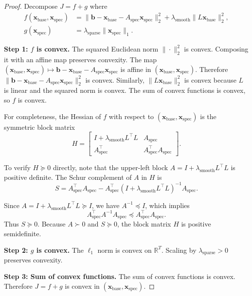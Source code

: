 \documentclass[10pt]{article} %
\theoremstyle{plain}
\theoremstyle{definition}
\newcommand{\xbase}{\mathbf{x}_{\text{base}}}
\newcommand{\xspec}{\mathbf{x}_{\text{spec}}}
\newcommand{\Aspec}{A_{\text{spec}}}
\newcommand{\bvec}{\mathbf{b}}
\begin{document}
\begin{proof}
Decompose $J = f + g$ where
\begin{align*}
f(\xbase, \xspec) &= \|\bvec - \xbase - \Aspec \xspec\|_2^2 + \lambda_{\text{smooth}} \|L \xbase\|_2^2, \\
g(\xspec) &= \lambda_{\text{sparse}} \|\xspec\|_1.
\end{align*}

\textbf{Step 1: $f$ is convex.} The squared Euclidean norm $\|\cdot\|_2^2$ is convex. Composing it with an affine map preserves convexity. The map $(\xbase, \xspec) \mapsto \bvec - \xbase - \Aspec \xspec$ is affine in $(\xbase, \xspec)$. Therefore $\|\bvec - \xbase - \Aspec \xspec\|_2^2$ is convex. Similarly, $\|L \xbase\|_2^2$ is convex because $L$ is linear and the squared norm is convex. The sum of convex functions is convex, so $f$ is convex.

For completeness, the Hessian of $f$ with respect to $(\xbase, \xspec)$ is the symmetric block matrix
\begin{equation}
H = \begin{bmatrix} I + \lambda_{\text{smooth}} L^\top L & \Aspec \\ \Aspec^\top & \Aspec^\top \Aspec \end{bmatrix}.
\end{equation}

To verify $H \succeq 0$ directly, note that the upper-left block $A = I + \lambda_{\text{smooth}} L^\top L$ is positive definite. The Schur complement of $A$ in $H$ is
\begin{equation}
S = \Aspec^\top \Aspec - \Aspec^\top (I + \lambda_{\text{smooth}} L^\top L)^{-1} \Aspec.
\end{equation}

Since $A = I + \lambda_{\text{smooth}} L^\top L \succeq I$, we have $A^{-1} \preceq I$, which implies
\begin{equation}
\Aspec^\top A^{-1} \Aspec \preceq \Aspec^\top \Aspec.
\end{equation}
Thus $S \succeq 0$. Because $A \succ 0$ and $S \succeq 0$, the block matrix $H$ is positive semidefinite.

\textbf{Step 2: $g$ is convex.} The $\ell_1$ norm is convex on $\mathbb{R}^T$. Scaling by $\lambda_{\text{sparse}} > 0$ preserves convexity.

\textbf{Step 3: Sum of convex functions.} The sum of convex functions is convex. Therefore $J = f + g$ is convex in $(\xbase, \xspec)$.
\end{proof}
\end{document}
